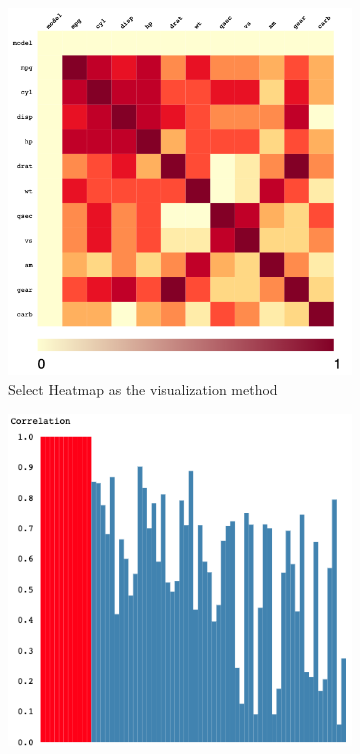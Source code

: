 \begin{figure}[h]
	\centering
	\begin{subfigure}[b]{0.32\textwidth}
	\centering
	\includegraphics[width=\textwidth]{pictures/correlationMatrix}
	\caption{Select Heatmap as the visualization method}
		\label{fig:chooseHM}
\end{subfigure}
\hfill
\begin{subfigure}[b]{0.32\textwidth}
	\centering
	\includegraphics[width=\textwidth]{pictures/bg}

\end{subfigure}
\end{figure}
